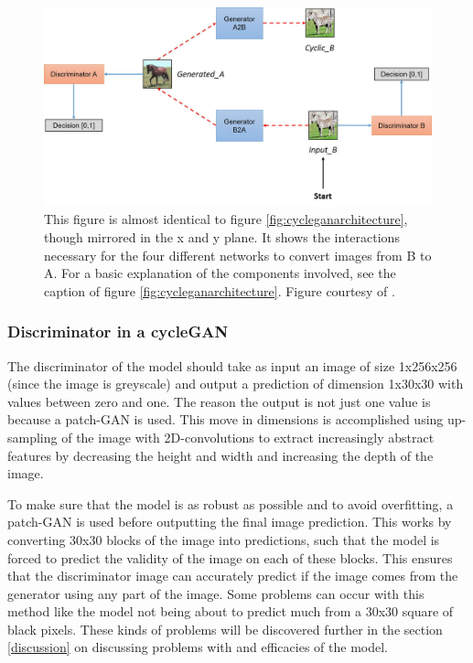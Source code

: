 \documentclass[12pt, fleqn, titlepage]{article}
\begin{document}
\begin{figure}[H]
	\centering
	\includegraphics[width=0.7\linewidth]{imgs/cyclegan_architecture2}
	\caption{This figure is almost identical to figure \ref{fig:cycleganarchitecture}, though mirrored in the x and y plane. It shows the interactions necessary for the four different networks to convert images from B to A. For a basic explanation of the components involved, see the caption of figure \ref{fig:cycleganarchitecture}. Figure courtesy of \cite{model_architecture}.}
	\label{fig:cycleganarchitecture2}
\end{figure}


\subsubsection{Discriminator in a cycleGAN}
The discriminator of the model should take as input an image of size 1x256x256 (since the image is greyscale) and output a prediction of dimension 1x30x30 with values between zero and one. The reason the output is not just one value is because a patch-GAN is used. This move in dimensions is accomplished using up-sampling of the image with 2D-convolutions to extract increasingly abstract features by decreasing the height and width and increasing the depth of the image.

To make sure that the model is as robust as possible and to avoid overfitting, a patch-GAN is used before outputting the final image prediction. This works by converting 30x30 blocks of the image into predictions, such that the model is forced to predict the validity of the image on each of these blocks. This ensures that the discriminator image can accurately predict if the image comes from the generator using any part of the image. Some problems can occur with this method like the model not being about to predict much from a 30x30 square of black pixels. These kinds of problems will be discovered further in the section \ref{discussion} on discussing problems with and efficacies of the model.
\end{document}
